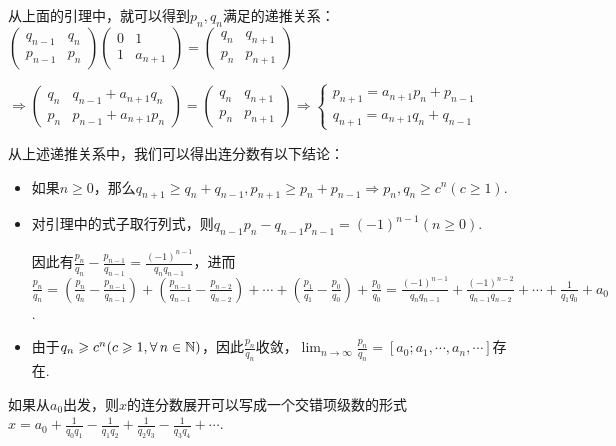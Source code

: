 从上面的引理中，就可以得到$p_n,q_n$满足的递推关系：
$\begin{pmatrix}
    q_{n-1} & q_n \\
    p_{n-1} & p_n
\end{pmatrix}\begin{pmatrix}
    0 & 1 \\
    1 & a_{n+1}
\end{pmatrix}=\begin{pmatrix}
    q_n & q_{n+1} \\
    p_n & p_{n+1}
\end{pmatrix}$\par
$\Rightarrow \begin{pmatrix}
    q_n & q_{n-1}+a_{n+1}q_n \\
    p_n & p_{n-1}+a_{n+1}p_n
\end{pmatrix}=\begin{pmatrix}
    q_n & q_{n+1} \\
    p_n & p_{n+1}
\end{pmatrix} \Rightarrow \begin{cases}
    p_{n+1}=a_{n+1}p_n+p_{n-1} \\
    q_{n+1}=a_{n+1}q_n+q_{n-1}
\end{cases}$\par
从上述递推关系中，我们可以得出连分数有以下结论：
\begin{itemize}
    \item 如果$n\geq 0$，那么$q_{n+1}\geq q_n+q_{n-1},p_{n+1}\geq p_n+p_{n-1}\Rightarrow p_n,q_n\geq c^n(c\geq 1)$.
    \item 对引理中的式子取行列式，则$q_{n-1}p_n-q_{n-1}p_{n-1}=(-1)^{n-1}(n\geq 0)$.\par
    因此有$\frac{p_n}{q_n}-\frac{p_{n-1}}{q_{n-1}}=\frac{(-1)^{n-1}}{q_nq_{n-1}}$，进而$\frac{p_n}{q_n}=\left(\frac{p_n}{q_n}-\frac{p_{n-1}}{q_{n-1}}\right)+\left(\frac{p_{n-1}}{q_{n-1}}-\frac{p_{n-2}}{q_{n-2}}\right)+\cdots+\left(\frac{p_1}{q_1}-\frac{p_0}{q_0}\right)+\frac{p_0}{q_0}=\frac{(-1)^{n-1}}{q_nq_{n-1}}+\frac{(-1)^{n-2}}{q_{n-1}q_{n-2}}+\cdots+\frac{1}{q_1q_0}+a_0$.
    \item 由于$q_n\geqslant c^n(c\geqslant 1,\forall\, n\in\mathbb{N})$，因此$\frac{p_n}{q_n}$收敛，$\lim_{n\to\infty}{\frac{p_n}{q_n}}=[a_0;a_1,\cdots,a_n,\cdots]$存在.
\end{itemize}\par
如果从$a_0$出发，则$x$的连分数展开可以写成一个交错项级数的形式$x=a_0+\frac{1}{q_0q_1}-\frac{1}{q_1q_2}+\frac{1}{q_2q_3}-\frac{1}{q_3q_4}+\cdots$.\par
